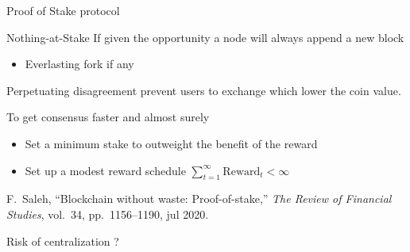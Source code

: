 \documentclass{beamer}
\begin{document}
{\begin{frame}{Proof of Stake protocol}
\end{frame}
\begin{frame}{Nothing-at-Stake}
If given the opportunity a node will always append a new block
\begin{itemize}
  \item Everlasting fork if any
\end{itemize}
Perpetuating disagreement prevent users to exchange which lower the coin value.
\begin{theorem}[Saleh 2020]
To get consensus faster and almost surely 
\begin{itemize}
  \item Set a minimum stake to outweight the benefit of the reward
  \item Set up a modest reward schedule $\sum_{t = 1}^\infty \text{Reward}_t<\infty$
\end{itemize}
\end{theorem}
\tiny
\begin{thebibliography}{1}

F.~Saleh, ``Blockchain without waste: Proof-of-stake,'' {\em The Review of
  Financial Studies}, vol.~34, pp.~1156--1190, jul 2020.
\end{thebibliography}
\end{frame}
\begin{frame}{Risk of centralization ?}

\end{frame}
}
\end{document}
